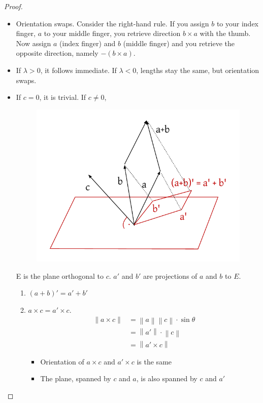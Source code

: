 \documentclass{article}
\numberwithin{lecref}{section}
\newcommand{\norm}[1]{\left\|#1\right\|}
\begin{document}
\begin{proof}
  \begin{itemize}
    \item Orientation swaps. Consider the right-hand rule. If you assign $b$ to your index finger, $a$ to your middle finger, you retrieve direction $b \times a$ with the thumb. Now assign $a$ (index finger) and $b$ (middle finger) and you retrieve the opposite direction, namely $- \left(b \times a\right)$.
    \item If $\lambda > 0$, it follows immediate.
      If $\lambda < 0$, lengths stay the same, but orientation swaps.
    \item If $c = 0$, it is trivial. If $c \neq 0$,
      \begin{figure}[!ht]
        \begin{center}
          \includegraphics{img/04_apbmc_eq_amcpbmc.pdf}
        \end{center}
      \end{figure}
      E is the plane orthogonal to $c$. $a'$ and $b'$ are projections of $a$ and $b$ to $E$.

      \begin{enumerate}
        \item $(a+b)' = a' + b'$
        \item $a \times c = a' \times c$.
          \begin{align*}
            \norm{a \times c} &= \norm a \norm c \cdot \sin\theta \\
              &= \norm{a'} \cdot \norm{c} \\
              &= \norm{a' \times c}
          \end{align*}
          \begin{itemize}
            \item Orientation of $a \times c$ and $a' \times c$ is the same
            \item The plane, spanned by $c$ and $a$, is also spanned by $c$ and $a'$
          \end{itemize}


\end{enumerate}
\end{itemize}
\end{proof}
\end{document}
